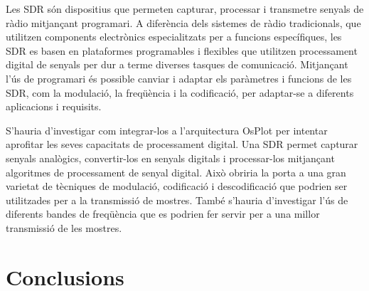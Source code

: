 \documentclass{tfgitic}[2023/06/30]
\begin{document}
Les SDR són dispositius que permeten capturar, processar i transmetre
senyals de ràdio mitjançant programari. A diferència dels sistemes de
ràdio tradicionals, que utilitzen components electrònics
especialitzats per a funcions específiques, les SDR es basen en
plataformes programables i flexibles que utilitzen processament
digital de senyals per dur a terme diverses tasques de comunicació.
Mitjançant l'ús de programari és possible canviar i adaptar els
paràmetres i funcions de les SDR, com la modulació, la freqüència i la
codificació, per adaptar-se a diferents aplicacions i requisits.

S'hauria d'investigar com integrar-los a l'arquitectura OsPlot per
intentar aprofitar les seves capacitats de processament digital. Una
SDR permet capturar senyals analògics, convertir-los en senyals
digitals i processar-los mitjançant algoritmes de processament de
senyal digital. Això obriria la porta a una gran varietat de tècniques
de modulació, codificació i descodificació que podrien ser utilitzades
per a la transmissió de mostres. També s'hauria d'investigar l'ús de
diferents bandes de freqüència que es podrien fer servir per a una
millor transmissió de les mostres.

\chapter{Conclusions}

\printbibliography
\end{document}
